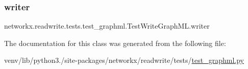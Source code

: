 \subsubsection{\texorpdfstring{writer}{writer}}
{\footnotesize\ttfamily networkx.\+readwrite.\+tests.\+test\+\_\+graphml.\+Test\+Write\+Graph\+M\+L.\+writer\hspace{0.3cm}{\ttfamily [static]}}



The documentation for this class was generated from the following file\+:\begin{DoxyCompactItemize}
\item 
venv/lib/python3./site-\/packages/networkx/readwrite/tests/\hyperlink{test__graphml_8py}{test\+\_\+graphml.\+py}\end{DoxyCompactItemize}
